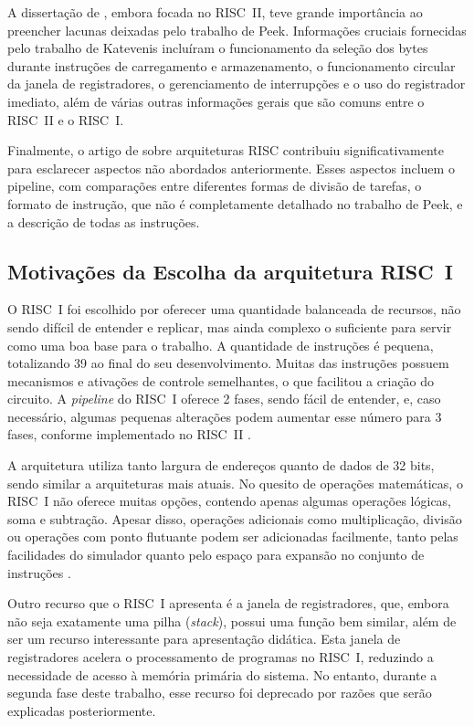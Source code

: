 \documentclass[
	12pt,				%
	openright,			%
	oneside,			%
	a4paper,			%
	english,			%
	french,				%
	spanish,			%
	brazil,				%
	]{abntex2}
\begin{document}
A dissertação de , embora focada no RISC~II, teve grande importância ao preencher lacunas deixadas pelo trabalho de Peek. Informações cruciais fornecidas pelo trabalho de Katevenis incluíram o funcionamento da seleção dos bytes durante instruções de carregamento e armazenamento, o funcionamento circular da janela de registradores, o gerenciamento de interrupções e o uso do registrador imediato, além de várias outras informações gerais que são comuns entre o RISC~II e o RISC~I.

Finalmente, o artigo de  sobre arquiteturas RISC contribuiu significativamente para esclarecer aspectos não abordados anteriormente. Esses aspectos incluem o pipeline, com comparações entre diferentes formas de divisão de tarefas, o formato de instrução, que não é completamente detalhado no trabalho de Peek, e a descrição de todas as instruções.

\subsection{Motivações da Escolha da arquitetura RISC~I}

O RISC~I foi escolhido por oferecer uma quantidade balanceada de recursos, não sendo difícil de entender e replicar, mas ainda complexo o suficiente para servir como uma boa base para o trabalho. A quantidade de instruções é pequena, totalizando 39 ao final do seu desenvolvimento. Muitas das instruções possuem mecanismos e ativações de controle semelhantes, o que facilitou a criação do circuito. A \textit{pipeline} do RISC~I oferece 2 fases, sendo fácil de entender, e, caso necessário, algumas pequenas alterações podem aumentar esse número para 3 fases, conforme implementado no RISC~II \cite{katevenis_reduced_1985}.

A arquitetura utiliza tanto largura de endereços quanto de dados de 32 bits, sendo similar a arquiteturas mais atuais. No quesito de operações matemáticas, o RISC~I não oferece muitas opções, contendo apenas algumas operações lógicas, soma e subtração. Apesar disso, operações adicionais como multiplicação, divisão ou operações com ponto flutuante podem ser adicionadas facilmente, tanto pelas facilidades do simulador quanto pelo espaço para expansão no conjunto de instruções \cite{peek_vlsi_1983}.

Outro recurso que o RISC~I apresenta é a janela de registradores, que, embora não seja exatamente uma pilha (\textit{stack}), possui uma função bem similar, além de ser um recurso interessante para apresentação didática. Esta janela de registradores acelera o processamento de programas no RISC~I, reduzindo a necessidade de acesso à memória primária do sistema\cite{peek_vlsi_1983}. No entanto, durante a segunda fase deste trabalho, esse recurso foi deprecado por razões que serão explicadas posteriormente.
\end{document}
